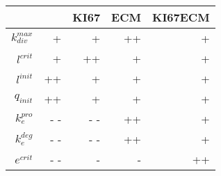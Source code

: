 \begin{tabular}{r| r r r r }
& &KI67 &ECM &KI67ECM \\
\hline 
$k_{div}^{max}$&+ &+ &++ &+ \\
$l^{crit}$&+ &++ &+ &+ \\
$l^{init}$&++ &+ &+ &+ \\
$q_{init}$&++ &+ &+ &+ \\
$k_{e}^{pro}$&- - &- - &++ &+ \\
$k_{e}^{deg}$&- - &- - &++ &+ \\
$e^{crit}$&- - &- &- &++ \\
\end{tabular}
